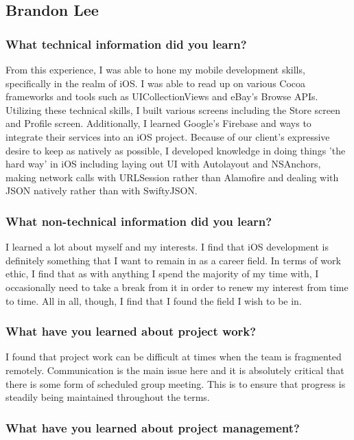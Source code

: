 \subsection{Brandon Lee}
\subsubsection{What technical information did you learn?}
From this experience, I was able to hone my mobile development skills, specifically in the realm of iOS. I was able to read up on various Cocoa frameworks and tools such as UICollectionViews and eBay's Browse APIs. Utilizing these technical skills, I built various screens including the Store screen and Profile screen. Additionally, I learned Google's Firebase and ways to integrate their services into an iOS project. Because of our client's expressive desire to keep as natively as possible, I developed knowledge in doing things 'the hard way' in iOS including laying out UI with Autolayout and NSAnchors, making network calls with URLSession rather than Alamofire and dealing with JSON natively rather than with SwiftyJSON.

\subsubsection{What non-technical information did you learn?}
I learned a lot about myself and my interests. I find that iOS development is definitely something that I want to remain in as a career field. In terms of work ethic, I find that as with anything I spend the majority of my time with, I occasionally need to take a break from it in order to renew my interest from time to time. All in all, though, I find that I found the field I wish to be in.

\subsubsection{What have you learned about project work?}
I found that project work can be difficult at times when the team is fragmented remotely. Communication is the main issue here and it is absolutely critical that there is some form of scheduled group meeting. This is to ensure that progress is steadily being maintained throughout the terms.


\subsubsection{What have you learned about project management?}

